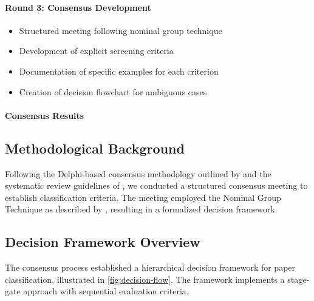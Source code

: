 \documentclass[a4paper,12pt]{article}
\begin{document}
\begin{enumerate}
    \paragraph{Round 3: Consensus Development}
    \begin{itemize}
        \item Structured meeting following nominal group technique \citep{delbecq1975group}
        \item Development of explicit screening criteria
        \item Documentation of specific examples for each criterion
        \item Creation of decision flowchart for ambiguous cases
    \end{itemize}



    \paragraph{Consensus Results}

\subsection{Methodological Background}
Following the Delphi-based consensus methodology outlined by \citet{dalkey1963experimental} and the systematic review guidelines of \citet{kitchenham2004procedures}, we conducted a structured consensus meeting to establish classification criteria. The meeting employed the Nominal Group Technique as described by \citet{delbecq1971group}, resulting in a formalized decision framework.

\subsection{Decision Framework Overview}
The consensus process established a hierarchical decision framework for paper classification, illustrated in \cref{fig:decision-flow}. The framework implements a stage-gate approach with sequential evaluation criteria.


\end{enumerate}
\end{document}
